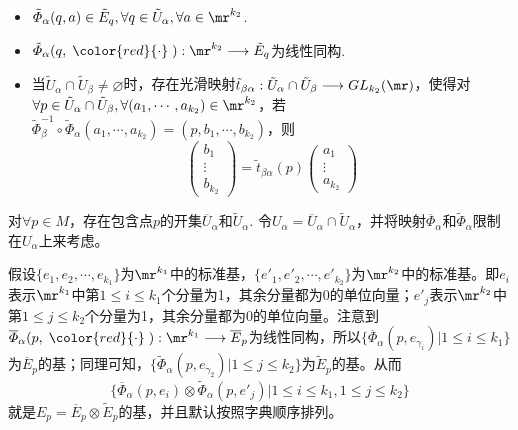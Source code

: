 \begin{itemize}
	\item[(1)] $\tilde{\varPhi}_{\alpha}(q,a)\in \tilde{E}_{q},\forall q\in \tilde{U}_{\alpha},\forall a\in \mr^{k_{2}}$.
	\item[(2)] $\tilde{\varPhi}_{\alpha}(q,\;{\color{red}{\cdot}}\;):\mr^{k_{2}}\longrightarrow \tilde{E}_{q}$为线性同构.
	\item[(3)] 当$\tilde{U}_{\alpha}\cap \tilde{U}_{\beta}\neq\varnothing$时，存在光滑映射$\tilde{t}_{\beta\alpha}:\tilde{U}_{\alpha}\cap \tilde{U}_{\beta}\longrightarrow GL_{k_{2}}(\mr)$，使得对$\forall p\in \tilde{U}_{\alpha}\cap \tilde{U}_{\beta},\forall (a_{1},\cdots,a_{k_{2}})\in \mr^{k_{2}}$，若$\tilde{\varPhi}_{\beta}^{-1}\circ\tilde{\varPhi}_{\alpha}(a_{1},\cdots,a_{k_{2}})=(p,b_{1},\cdots,b_{k_{2}})$，则
	\[
	\left( \begin{array}{ccc}{b_{1}} \\ {\vdots}  \\ {b_{k_{2}}} \end{array}\right)=\tilde{t}_{\beta\alpha}(p) \left( \begin{array}{ccc}{a_{1}} \\ {\vdots}  \\ {a_{k_{2}}} \end{array}\right)
	\]
\end{itemize}

对$\forall p\in M$，存在包含点$p$的开集$\overline{U}_{\alpha}$和$\tilde{U}_{\alpha}$. 令$U_{\alpha}=\overline{U}_{\alpha}\cap \tilde{U}_{\alpha}$，并将映射$\overline{\varPhi}_{\alpha}$和$\tilde{\varPhi}_{\alpha}$限制在$U_{\alpha}$上来考虑。

假设$\{e_{1},e_{2},\cdots,e_{k_{1}} \}$为$\mr^{k_{1}}$中的标准基，$\{e'_{1},e'_{2},\cdots,e'_{k_{2}} \}$为$\mr^{k_{2}}$中的标准基。即$e_{i}$表示$\mr^{k_{1}}$中第$1\leqslant i\leqslant k_{1}$个分量为1，其余分量都为0的单位向量；$e'_{j}$表示$\mr^{k_{2}}$中第$1\leqslant j\leqslant k_{2}$个分量为1，其余分量都为0的单位向量。注意到$\overline{\varPhi}_{\alpha}(p,\;{\color{red}{\cdot}}\;):\mr^{k_{1}}\longrightarrow \overline{E}_{p}$为线性同构，所以$\{\overline{\varPhi}_{\alpha}(p,e_{\gamma_{ i }})|1\leqslant i\leqslant k_{1} \}$为$\overline{E}_{p}$的基；同理可知，$\{\tilde{\varPhi}_{\alpha}(p,e_{\gamma_{2}}) |1\leqslant j\leqslant k_{2}\}$为$\tilde{E}_{p}$的基。从而
\[
\{\overline{\varPhi}_{\alpha}(p,e_{i})\otimes \tilde{\varPhi}_{\alpha}(p,e'_{j})| 1\leqslant i\leqslant k_{1},1\leqslant j\leqslant k_{2}\} 
\]
就是$E_{p}=\overline{E}_{p}\otimes \tilde{E}_{p}$的基，并且默认按照字典顺序排列。

